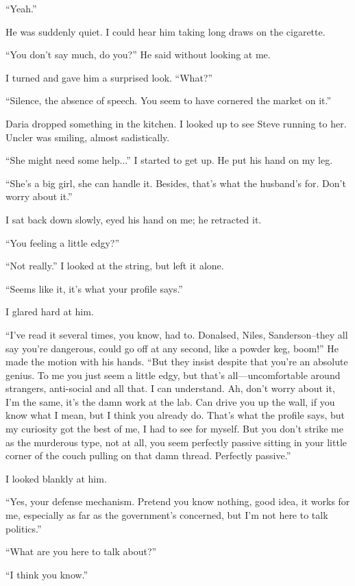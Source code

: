 \documentclass[
]{article}
\begin{document}
``Yeah.''

He was suddenly quiet. I could hear him taking long draws on the
cigarette.

``You don't say much, do you?'' He said without looking at me.

I turned and gave him a surprised look. ``What?''

``Silence, the absence of speech. You seem to have cornered the market
on it.''

Daria dropped something in the kitchen. I looked up to see Steve running
to her. Uncler was smiling, almost sadistically.

``She might need some help...'' I started to get up. He put his hand on
my leg.

``She's a big girl, she can handle it. Besides, that's what the
husband's for. Don't worry about it.''

I sat back down slowly, eyed his hand on me; he retracted it.

``You feeling a little edgy?''

``Not really.'' I looked at the string, but left it alone.

``Seems like it, it's what your profile says.''

I glared hard at him.

``I've read it several times, you know, had to. Donalsed, Niles,
Sanderson--they all say you're dangerous, could go off at any second,
like a powder keg, boom!'' He made the motion with his hands. ``But they
insist despite that you're an absolute genius. To me you just seem a
little edgy, but that's all---uncomfortable around strangers,
anti-social and all that. I can understand. Ah, don't worry about it,
I'm the same, it's the damn work at the lab. Can drive you up the wall,
if you know what I mean, but I think you already do. That's what the
profile says, but my curiosity got the best of me, I had to see for
myself. But you don't strike me as the murderous type, not at all, you
seem perfectly passive sitting in your little corner of the couch
pulling on that damn thread. Perfectly passive.''

I looked blankly at him.

``Yes, your defense mechanism. Pretend you know nothing, good idea, it
works for me, especially as far as the government's concerned, but I'm
not here to talk politics.''

``What are you here to talk about?''

``I think you know.''
\end{document}
